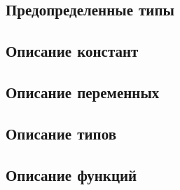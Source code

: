 \hypertarget{predefined-types}{%
\subsection{Предопределенные типы}\label{decls:predefined-types}}

\hypertarget{constants}{%
\subsection{Описание констант}\label{decls:constants}}

\hypertarget{variables}{%
\subsection{Описание переменных}\label{decls:variables}}

\hypertarget{types}{%
\subsection{Описание типов}\label{decls:types}}

\hypertarget{functions}{%
\subsection{Описание функций}\label{decls:functions}}